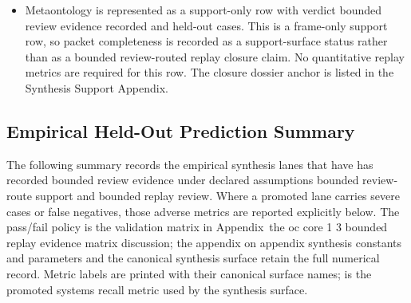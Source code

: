 \begin{itemize}[leftmargin=1.6em,nosep]
\item Metaontology is represented as a support-only row with verdict bounded review evidence recorded and  held-out cases. This is a frame-only support row, so packet completeness is recorded as a support-surface status rather than as a bounded review-routed replay closure claim. No quantitative replay metrics are required for this row. The closure dossier anchor is listed in the Synthesis Support Appendix.
\end{itemize}

\subsection{Empirical Held-Out Prediction Summary}
The following summary records the empirical synthesis lanes that have has recorded bounded review evidence under declared assumptions bounded review-route support and bounded replay review.
Where a promoted lane carries severe cases or false negatives, those adverse metrics are reported explicitly below. The pass/fail policy is the validation matrix in Appendix~the oc core 1 3 bounded replay evidence matrix discussion; the appendix on appendix synthesis constants and parameters and the canonical synthesis surface retain the full numerical record.
Metric labels are printed with their canonical surface names;  is the promoted systems recall metric used by the synthesis surface.

